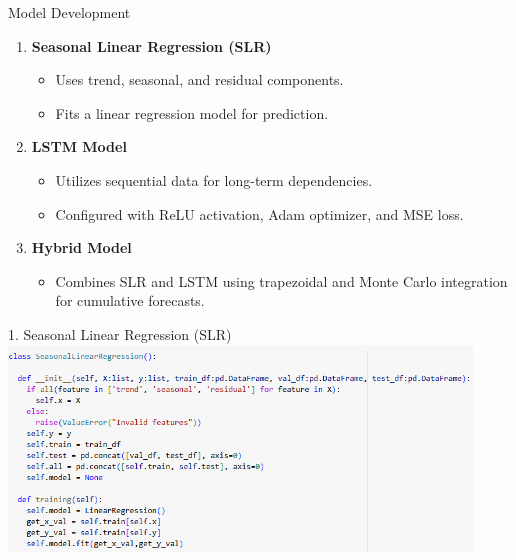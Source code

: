 \documentclass[10pt]{beamer}
\begin{document}
\begin{frame}{Model Development}
    \begin{enumerate}
        \item \textbf{Seasonal Linear Regression (SLR)}
            \begin{itemize}
                \item Uses trend, seasonal, and residual components.
                \item Fits a linear regression model for prediction.
            \end{itemize}

        \singlespacing

        \item \textbf{LSTM Model}
            \begin{itemize}
                \item Utilizes sequential data for long-term dependencies.
                \item Configured with ReLU activation, Adam optimizer, and MSE loss.
            \end{itemize}

        \singlespacing

        \item \textbf{Hybrid Model}
            \begin{itemize}
                \item Combines SLR and LSTM using trapezoidal and Monte Carlo integration for cumulative forecasts.
            \end{itemize}
    \end{enumerate}
\end{frame}

\begin{frame}{1. Seasonal Linear Regression (SLR)}
    \centering
    \includegraphics[height=5.5cm]{Seasonal Linear Regression.png}
\end{frame}
\end{document}
